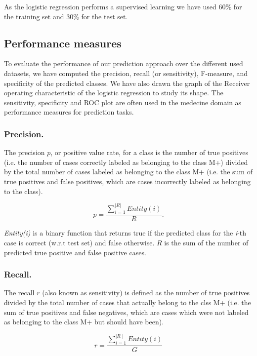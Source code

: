 As the logistic regression performs a supervised learning we have used 60\% for the training set and 30\% for the test set.

\subsection{Performance measures}
To evaluate the performance of our prediction approach over the different used datasets, we have computed the precision,
recall (or sensitivity), F-measure, and specificity of the predicted classes. We have also drawn the graph of the Receiver operating 
characteristic of the logistic regression to study its shape.  
The sensitivity, specificity and ROC plot are often used in the medecine domain as performance measures for prediction tasks.

\subsubsection{Precision.}

\label{precision} The precision $p$, or positive value rate, for a class is the number
 of true positives (i.e. the number of cases  correctly labeled as belonging to the class \textsc{M+})
 divided by the total number of cases labeled as belonging to the class \textsc{M+} (i.e. the sum of true positives 
and false positives, which are cases  incorrectly labeled as belonging to the class).


\begin{equation}
p=\frac{\sum_{i=1}^{|R|}Entity(i)}{R}.
\end{equation}

\textit{Entity(i)} is a binary function that returns true if the predicted class for the  \textit{i}-th case is correct (w.r.t test set) and false otherwise.
$R$ is the sum of the number of predicted true positive and  false positive cases.

\subsubsection{Recall.}
The recall $r$ (also known as sensitivity) is defined as the number of true positives divided by the total number of cases that actually belong
 to the clss \textsc{M+} (i.e. the sum of true positives and false negatives, which are cases which were not labeled as belonging to the class 
\textsc{M+} but should have been).

\begin{equation}
r=\frac{\sum_{i=1}^{\mid R\mid}Entity(i)}{G}
\label{recall}
\end{equation}

